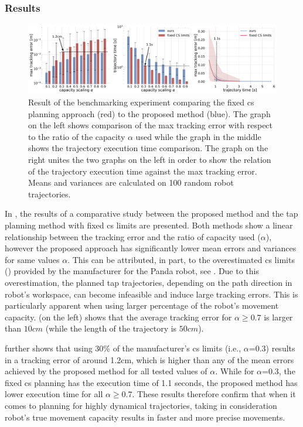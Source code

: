 \subsubsection*{Results} 
\begin{figure}[!t]
    \centering
    \includegraphics[width=\linewidth]{Papers/imgs/comparison_fixed_cs.pdf}
    \caption{Result of the benchmarking experiment comparing the fixed \gls{cs} planning approach (red) to the proposed method (blue). The graph on the left shows comparison of the max tracking error with respect to the ratio of the capacity $\alpha$ used while the graph in the middle shows the trajectory execution time comparison. The graph on the right unites the two graphs on the left in order to show the relation of the trajectory execution time against the max tracking error. Means and variances are calculated on 100 random robot trajectories. }
    \label{fig:comp_fixed_cs}
\end{figure}
In , the results of a comparative study between the proposed method and the \gls{tap} planning method with fixed \gls{cs} limits are presented. Both methods show a linear relationship between the tracking error and the ratio of capacity used ($\alpha$), however the proposed approach has significantly lower mean errors and variances for same values $\alpha$. This can be attributed, in part, to the overestimated \gls{cs} limits () provided by the manufacturer for the Panda robot, see . Due to this overestimation, the planned \gls{tap} trajectories, depending on the path direction in robot's workspace, can become infeasible and induce large tracking errors. This is particularly apparent when using larger percentage of the robot's movement capacity.  (on the left) shows that the average tracking error for $\alpha \geq 0.7$ is larger than $10cm$ (while the length of the trajectory is $50cm$).

 further shows that using 30\% of the manufacturer's \gls{cs} limits (i.e., $\alpha$=0.3) results in a tracking error of around 1.2cm, which is higher than any of the mean errors achieved by the proposed method for all tested values of $\alpha$.
While for $\alpha$=0.3, the fixed \gls{cs} planning has the execution time of 1.1 seconds, the proposed method has lower execution time for all $\alpha\geq0.7$. 
These results therefore confirm that when it comes to planning for highly dynamical trajectories, taking in consideration robot's true movement capacity results in faster and more precise movements. 


